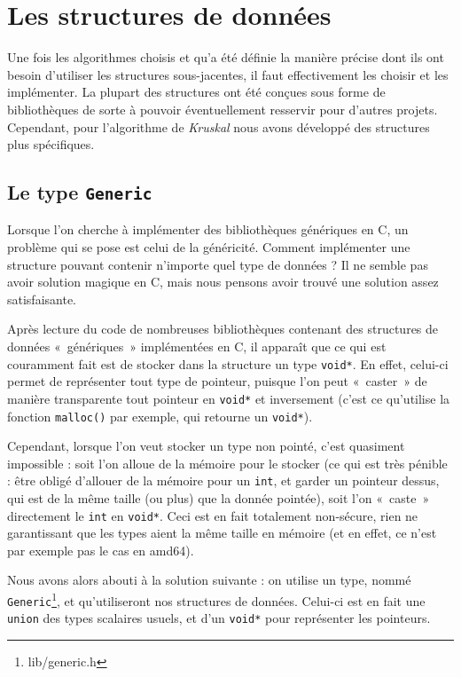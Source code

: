 \documentclass[a4paper]{article}
\begin{document}
\section{Les structures de données}

Une fois les algorithmes choisis et qu'a été définie la manière précise dont ils ont besoin d'utiliser les structures sous-jacentes, il faut effectivement les choisir et les implémenter. La plupart des structures ont été conçues sous forme de bibliothèques de sorte à pouvoir éventuellement resservir pour d'autres projets. Cependant, pour l'algorithme de \emph{Kruskal} nous avons développé des structures plus spécifiques.

\subsection{Le type \texttt{Generic}}

Lorsque l'on cherche à implémenter des bibliothèques génériques en C, un problème qui se pose est celui de la généricité. Comment implémenter une structure pouvant contenir n'importe quel type de données ? Il ne semble pas avoir solution magique en C, mais nous pensons avoir trouvé une solution assez satisfaisante.

Après lecture du code de nombreuses bibliothèques contenant des structures de données «~génériques~» implémentées en C, il apparaît que ce qui est couramment fait est de stocker dans la structure un type \texttt{void*}. En effet, celui-ci permet de représenter tout type de pointeur, puisque l'on peut «~caster~» de manière transparente tout pointeur en \texttt{void*} et inversement (c'est ce qu'utilise la fonction \texttt{malloc()} par exemple, qui retourne un \texttt{void*}).

Cependant, lorsque l'on veut stocker un type non pointé, c'est quasiment impossible : soit l'on alloue de la mémoire pour le stocker (ce qui est très pénible : être obligé d'allouer de la mémoire pour un \texttt{int}, et garder un pointeur dessus, qui est de la même taille (ou plus) que la donnée pointée), soit l'on «~caste~» directement le \texttt{int} en \texttt{void*}. Ceci est en fait totalement non-sécure, rien ne garantissant que les types aient la même taille en mémoire (et en effet, ce n'est par exemple pas le cas en amd64).

Nous avons alors abouti à la solution suivante : on utilise un type, nommé \texttt{Generic}\footnote{lib/generic.h}, et qu'utiliseront nos structures de données. Celui-ci est en fait une \texttt{union} des types scalaires usuels, et d'un \texttt{void*} pour représenter les pointeurs.
\end{document}
